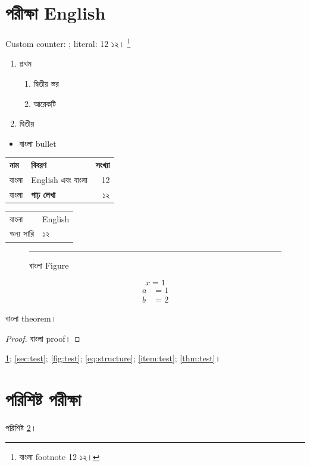 \tableofcontents
\section{পরীক্ষা English}\label{sec:test}
\setcounter{custom}{12}
Custom counter: ; literal: 12 ১২।
\footnote{বাংলা footnote 12 ১২।}
\begin{enumerate}
\item প্রথম\label{item:test}
\begin{enumerate}\item দ্বিতীয় স্তর\item আরেকটি\end{enumerate}
\item দ্বিতীয়
\end{enumerate}
\begin{itemize}\item বাংলা bullet\end{itemize}
\begin{tabular}{lp{5cm}r}
\textbf{নাম}&\textbf{বিবরণ}&\textbf{সংখ্যা}\\
বাংলা&English এবং বাংলা&12\\
বাংলা&\textbf{গাঢ় লেখা}&১২
\end{tabular}
\begin{longtable}{ll}বাংলা&English\\অন্য সারি&১২\end{longtable}
\begin{figure}[ht]\centering\rule{2cm}{1cm}
\caption{বাংলা Figure}\label{fig:test}\end{figure}
\begin{equation}x=1\label{eq:structure}\end{equation}
\begin{subequations}\begin{align}a&=1\\b&=2\end{align}\end{subequations}
\begin{theorem}\label{thm:test}বাংলা theorem।\end{theorem}
\begin{proof}বাংলা proof।\end{proof}
\ref{sec:test}; \autoref{sec:test}; \autoref{fig:test};
\eqref{eq:structure}; \ref{item:test}; \autoref{thm:test}।
\appendix\section{পরিশিষ্ট পরীক্ষা}\label{app:test}
পরিশিষ্ট \ref{app:test}।
